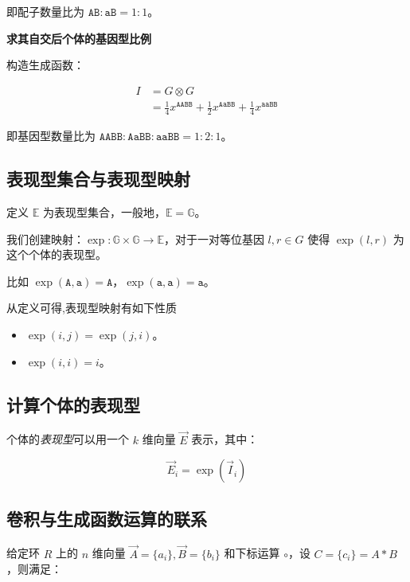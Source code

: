 \documentclass[12pt]{article} %
\begin{document}
即配子数量比为 $\texttt{AB} : \texttt{aB}=1:1$。

\textbf{求其自交后个体的基因型比例}

构造生成函数：

$$\begin{aligned}
    I &= G \otimes G \\
        &= \frac{1}{4} x^{\texttt{AABB}} + \frac{1}{2} x^{\texttt{AaBB}} + \frac{1}{4} x^{\texttt{aaBB}}
\end{aligned}$$

即基因型数量比为 $\texttt{AABB} : \texttt{AaBB} : \texttt{aaBB}=1:2:1$。

\subsection{表现型集合与表现型映射}

定义 $\mathbb{E}$ 为表现型集合，一般地，$\mathbb{E}=\mathbb{G}$。

我们创建映射：$\operatorname{exp}:\mathbb{G} \times \mathbb{G} \to \mathbb{E}$，对于一对等位基因 $l,r \in G$ 使得 $\operatorname{exp}(l,r)$ 为这个个体的表现型。


比如 $\operatorname{exp}(\texttt{A},\texttt{a})=\texttt{A}$，$\operatorname{exp}(\texttt{a},\texttt{a})=\texttt{a}$。

从定义可得,表现型映射有如下性质

\begin{itemize}
    \item $\operatorname{exp}(i,j)=\operatorname{exp}(j,i)$。
    \item $\operatorname{exp}(i,i)=i$。
\end{itemize}

\subsection{计算个体的表现型}

个体的\textsl{表现型}可以用一个 $k$ 维向量 $\vec E$ 表示，其中：

$$\vec E_i=\operatorname{exp}(\vec I_i)$$

\subsection{卷积与生成函数运算的联系}
给定环 $R$ 上的 $n$ 维向量 $\vec A=\{a_i\},\vec B=\{b_i\}$ 和下标运算 $\circ$，设 $C=\{c_i\}=A*B$，则满足：
\end{document}
